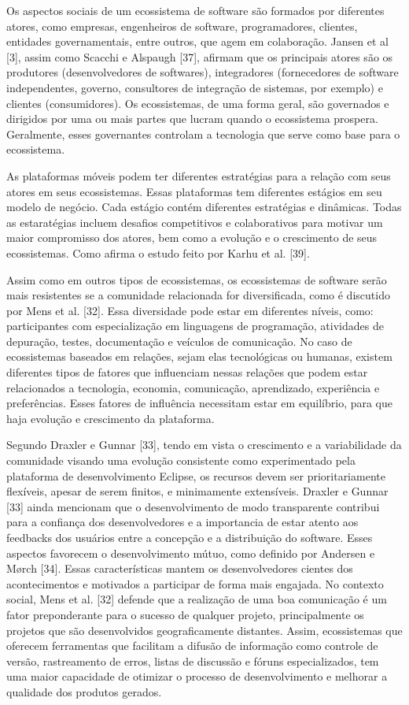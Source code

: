 \documentclass[conference]{IEEEtran}
\begin{document}
Os aspectos sociais de um ecossistema de software são formados por diferentes atores, como empresas, engenheiros de software, programadores, clientes, entidades governamentais, entre outros, que agem em colaboração. Jansen et al [3], assim como Scacchi e Alspaugh [37], afirmam que os principais atores são os produtores (desenvolvedores de softwares), integradores (fornecedores de software independentes, governo, consultores de integração de sistemas, por exemplo) e clientes (consumidores). Os ecossistemas, de uma forma geral, são governados e dirigidos por uma ou mais partes que lucram quando o ecossistema prospera. Geralmente, esses governantes controlam a tecnologia que serve como base para o ecossistema.

As plataformas móveis podem ter diferentes estratégias para a relação com seus atores em seus ecossistemas. Essas plataformas tem diferentes estágios em seu modelo de negócio. Cada estágio contém diferentes estratégias e dinâmicas. Todas as estaratégias incluem desafios competitivos e colaborativos para motivar um maior compromisso dos atores, bem como a evolução e o crescimento de seus ecossistemas. Como afirma o estudo feito por Karhu et al. [39]. 

Assim como em outros tipos de ecossistemas, os ecossistemas de software serão mais resistentes se a comunidade relacionada for diversificada, como é discutido por Mens et al. [32]. Essa diversidade pode estar em diferentes níveis, como: participantes com especialização em linguagens de programação, atividades de depuração, testes, documentação e veículos de comunicação. No caso de ecossistemas baseados em relações, sejam elas tecnológicas ou humanas, existem diferentes tipos de fatores que influenciam nessas relações que podem estar relacionados a tecnologia, economia, comunicação, aprendizado, experiência e preferências. Esses fatores de influência necessitam estar em equilíbrio, para que haja evolução e crescimento da plataforma. 

Segundo Draxler e Gunnar [33], tendo em vista o crescimento e a variabilidade da comunidade visando uma evolução consistente como experimentado pela plataforma de desenvolvimento Eclipse, os recursos devem ser prioritariamente flexíveis, apesar de serem finitos, e minimamente extensíveis. Draxler e Gunnar [33] ainda mencionam que o desenvolvimento de modo transparente contribui para a confiança dos desenvolvedores e a importancia de estar atento aos feedbacks dos usuários entre a concepção e a distribuição do software. Esses aspectos favorecem o desenvolvimento mútuo, como definido por Andersen e Mørch [34]. Essas características  mantem os desenvolvedores cientes dos acontecimentos e motivados a participar de forma mais engajada. No contexto social, Mens et al. [32] defende que a realização de uma boa comunicação é um fator preponderante para o sucesso de qualquer projeto, principalmente os projetos que são desenvolvidos geograficamente distantes. Assim, ecossistemas que oferecem ferramentas que facilitam a difusão de informação como controle de versão, rastreamento de erros, listas de discussão e fóruns especializados,  tem uma maior capacidade de otimizar o processo de desenvolvimento e melhorar a qualidade dos produtos gerados.
\end{document}
